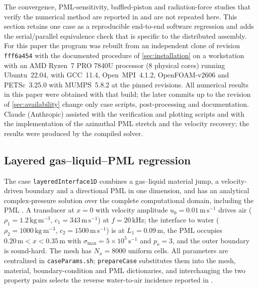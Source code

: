\documentclass[final,12pt,nopreprintline]{elsarticle}
\newcommand{\code}[1]{\texttt{#1}}
\begin{document}
The convergence, PML-sensitivity, baffled-piston and radiation-force studies
that verify the numerical method are reported in \cite{Xu2026HelmholtzPML}
and are not repeated here.  This section retains one case as a reproducible
end-to-end software regression and adds the serial/parallel equivalence check
that is specific to the distributed assembly.  For this paper the program was
rebuilt from an independent clone of revision \code{fff6a454} with the
documented procedure of \cref{sec:installation} on a workstation with an
AMD Ryzen~7 PRO 7840U processor (8 physical cores) running Ubuntu~22.04,
with GCC~11.4, Open~MPI~4.1.2, OpenFOAM-v2606 and PETSc~3.25.0 with
MUMPS~5.8.2 at the pinned revisions.  All numerical results in this paper were obtained with that
build; the later commits up to the revision of \cref{sec:availability} change
only case scripts, post-processing and documentation.  Claude (Anthropic) assisted with the
verification and plotting scripts and with the implementation of the azimuthal
PML stretch and the velocity recovery; the results were produced by the
compiled solver.

\subsection{Layered gas--liquid--PML regression}
\label{sec:layeredRegression}

The case \code{layeredInterface1D} combines a gas--liquid material jump, a
velocity-driven boundary and a directional PML in one dimension, and has an
analytical complex-pressure solution over the complete computational domain,
including the PML \cite{Xu2026HelmholtzPML}.  A transducer at $x=0$ with
velocity amplitude $u_0=0.01\,\mathrm{m\,s^{-1}}$ drives air
($\rho_1=1.2\,\mathrm{kg\,m^{-3}}$, $c_1=343\,\mathrm{m\,s^{-1}}$) at
$f=20\,\mathrm{kHz}$; the interface to water
($\rho_2=1000\,\mathrm{kg\,m^{-3}}$, $c_2=1500\,\mathrm{m\,s^{-1}}$) is at
$L_1=0.09\,\mathrm{m}$, the PML occupies $0.20\,\mathrm{m}<x<0.35\,\mathrm{m}$
with $\sigma_{\max}=5\times10^5\,\mathrm{s^{-1}}$ and $p_o=3$, and the outer
boundary is sound-hard.  The mesh has $N_x=8000$ uniform cells.  All
parameters are centralized in \code{caseParams.sh}; \code{prepareCase}
substitutes them into the mesh, material, boundary-condition and PML
dictionaries, and interchanging the two property pairs selects the reverse
water-to-air incidence reported in \cite{Xu2026HelmholtzPML}.
\end{document}
